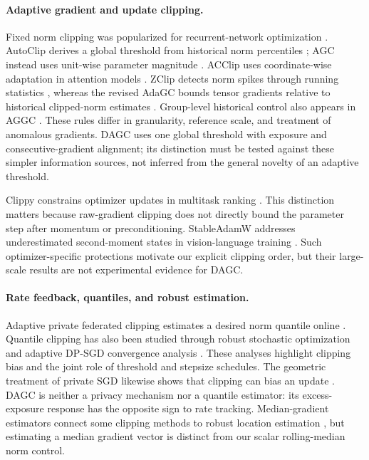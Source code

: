 \documentclass{article}
\begin{document}
\paragraph{Adaptive gradient and update clipping.}
Fixed norm clipping was popularized for recurrent-network optimization
\citep{pascanu2013difficulty}. AutoClip derives a global threshold from
historical norm percentiles \citep{seetharaman2020autoclip}; AGC instead
uses unit-wise parameter magnitude \citep{brock2021high}. ACClip uses
coordinate-wise adaptation in attention models \citep{zhang2020gradient}.
ZClip detects norm spikes through running statistics \citep{kumar2025zclip},
whereas the revised AdaGC bounds tensor gradients relative to historical
clipped-norm estimates \citep{wang2025adagc}. Group-level historical control
also appears in AGGC \citep{li2026aggc}. These rules differ in granularity,
reference scale, and treatment of anomalous gradients. DAGC uses one global
threshold with exposure and consecutive-gradient alignment; its distinction
must be tested against these simpler information sources, not inferred from
the general novelty of an adaptive threshold.

Clippy constrains optimizer updates in multitask ranking
\citep{tang2023clippy}. This distinction matters because raw-gradient clipping
does not directly bound the parameter step after momentum or preconditioning.
StableAdamW addresses underestimated second-moment states in vision-language
training \citep{wortsman2023stableadamw}. Such optimizer-specific protections
motivate our explicit clipping order, but their large-scale results are not
experimental evidence for DAGC.

\paragraph{Rate feedback, quantiles, and robust estimation.}
Adaptive private federated clipping estimates a desired norm quantile online
\citep{andrew2021adaptive}. Quantile clipping has also been studied through
robust stochastic optimization \citep{merad2024quantile} and adaptive
DP-SGD convergence analysis \citep{shulgin2024adaptive}. These analyses
highlight clipping bias and the joint role of threshold and stepsize schedules.
The geometric treatment of private SGD likewise shows that clipping can bias
an update \citep{chen2020geometric}. DAGC is neither a privacy mechanism nor
a quantile estimator: its excess-exposure response has the opposite sign to
rate tracking. Median-gradient estimators connect some clipping methods to
robust location estimation \citep{schaipp2025median}, but estimating a median
gradient vector is distinct from our scalar rolling-median norm control.
\end{document}
